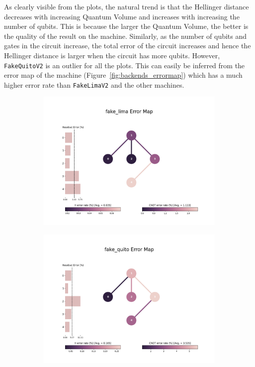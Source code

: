 \documentclass[11pt]{article}
\begin{document}
As clearly visible from the plots, the natural trend is that the Hellinger distance decreases with increasing Quantum Volume and increases with increasing the number of qubits. This is because the larger the Quantum Volume, the better is the quality of the result on the machine. Similarly, as the number of qubits and gates in the circuit increase, the total error of the circuit increases and hence the Hellinger distance is larger when the circuit has more qubits. However, \texttt{FakeQuitoV2} is an outlier for all the plots. This can easily be inferred from the error map of the machine (Figure~\ref{fig:backends_errormap}) which has a much higher error rate than \texttt{FakeLimaV2} and the other machines.
\begin{figure}[hbtp]
    \begin{subfigure}{0.5\linewidth}
        \centering
        \includegraphics[width=0.9\linewidth]{outputs/errormap_FakeLimaV2.png}
    \end{subfigure}
    \begin{subfigure}{0.5\linewidth}
        \centering
        \includegraphics[width=0.9\linewidth]{outputs/errormap_FakeQuitoV2.png}

\end{subfigure}
\end{figure}
\end{document}
